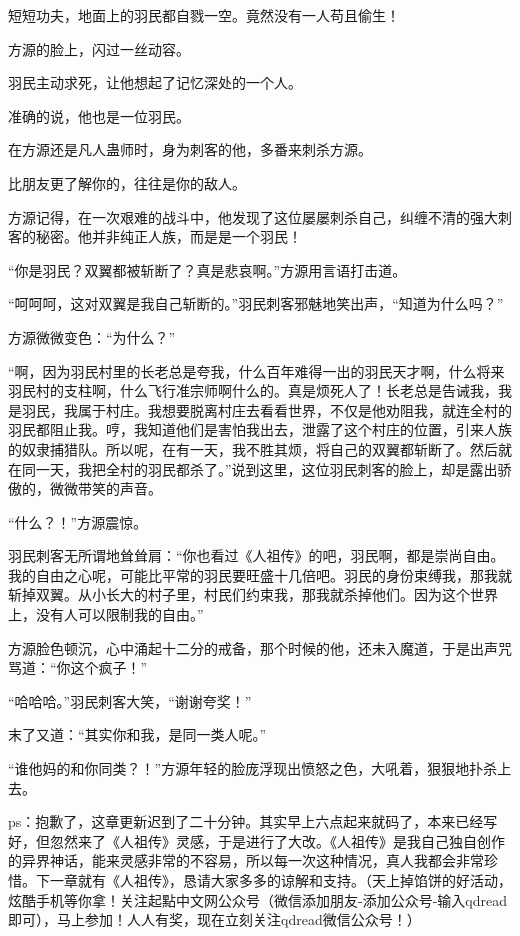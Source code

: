 \begin{this_body}
短短功夫，地面上的羽民都自戮一空。竟然没有一人苟且偷生！

方源的脸上，闪过一丝动容。

羽民主动求死，让他想起了记忆深处的一个人。

准确的说，他也是一位羽民。

在方源还是凡人蛊师时，身为刺客的他，多番来刺杀方源。

比朋友更了解你的，往往是你的敌人。

方源记得，在一次艰难的战斗中，他发现了这位屡屡刺杀自己，纠缠不清的强大刺客的秘密。他并非纯正人族，而是是一个羽民！

“你是羽民？双翼都被斩断了？真是悲哀啊。”方源用言语打击道。

“呵呵呵，这对双翼是我自己斩断的。”羽民刺客邪魅地笑出声，“知道为什么吗？”

方源微微变色：“为什么？”

“啊，因为羽民村里的长老总是夸我，什么百年难得一出的羽民天才啊，什么将来羽民村的支柱啊，什么飞行准宗师啊什么的。真是烦死人了！长老总是告诫我，我是羽民，我属于村庄。我想要脱离村庄去看看世界，不仅是他劝阻我，就连全村的羽民都阻止我。哼，我知道他们是害怕我出去，泄露了这个村庄的位置，引来人族的奴隶捕猎队。所以呢，在有一天，我不胜其烦，将自己的双翼都斩断了。然后就在同一天，我把全村的羽民都杀了。”说到这里，这位羽民刺客的脸上，却是露出骄傲的，微微带笑的声音。

“什么？！”方源震惊。

羽民刺客无所谓地耸耸肩：“你也看过《人祖传》的吧，羽民啊，都是崇尚自由。我的自由之心呢，可能比平常的羽民要旺盛十几倍吧。羽民的身份束缚我，那我就斩掉双翼。从小长大的村子里，村民们约束我，那我就杀掉他们。因为这个世界上，没有人可以限制我的自由。”

方源脸色顿沉，心中涌起十二分的戒备，那个时候的他，还未入魔道，于是出声咒骂道：“你这个疯子！”

“哈哈哈。”羽民刺客大笑，“谢谢夸奖！”

末了又道：“其实你和我，是同一类人呢。”

“谁他妈的和你同类？！”方源年轻的脸庞浮现出愤怒之色，大吼着，狠狠地扑杀上去。

ps：抱歉了，这章更新迟到了二十分钟。其实早上六点起来就码了，本来已经写好，但忽然来了《人祖传》灵感，于是进行了大改。《人祖传》是我自己独自创作的异界神话，能来灵感非常的不容易，所以每一次这种情况，真人我都会非常珍惜。下一章就有《人祖传》，恳请大家多多的谅解和支持。（天上掉馅饼的好活动，炫酷手机等你拿！关注起點中文网公众号（微信添加朋友-添加公众号-输入qdread即可），马上参加！人人有奖，现在立刻关注qdread微信公众号！）

\end{this_body}

